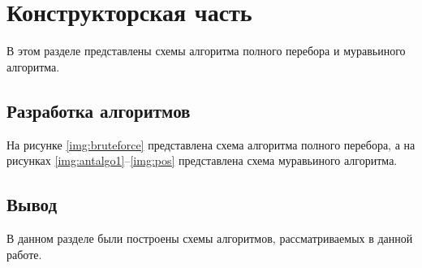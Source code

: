 \chapter{Конструкторская часть}
В этом разделе представлены схемы алгоритма полного перебора и муравьиного алгоритма.

\section{Разработка алгоритмов}

На рисунке \ref{img:bruteforce} представлена схема алгоритма полного перебора, а на рисунках \ref{img:antalgo1}--\ref{img:pos} представлена схема муравьиного алгоритма.

\clearpage

\section*{Вывод}
В данном разделе были построены схемы алгоритмов, рассматриваемых в данной работе.
